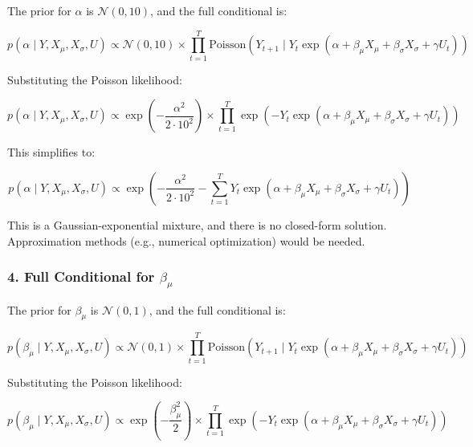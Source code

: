 \documentclass[
  letterpaper,
  DIV=11,
  numbers=noendperiod]{scrartcl}
\begin{document}
The prior for \(\alpha\) is \(\mathcal{N}(0, 10)\), and the full
conditional is:

\begin{equation}
p(\alpha \mid Y, X_{\mu}, X_{\sigma}, U) \propto \mathcal{N}(0, 10) \times \prod_{t=1}^{T} \text{Poisson}(Y_{t+1} \mid Y_t \exp(\alpha + \beta_{\mu} X_{\mu} + \beta_{\sigma} X_{\sigma} + \gamma U_t))
\end{equation}

Substituting the Poisson likelihood:

\begin{equation}
p(\alpha \mid Y, X_{\mu}, X_{\sigma}, U) \propto \exp\left( -\frac{\alpha^2}{2 \cdot 10^2} \right) \times \prod_{t=1}^{T} \exp\left( -Y_t \exp(\alpha + \beta_{\mu} X_{\mu} + \beta_{\sigma} X_{\sigma} + \gamma U_t) \right)
\end{equation}

This simplifies to:

\begin{equation}
p(\alpha \mid Y, X_{\mu}, X_{\sigma}, U) \propto \exp\left( -\frac{\alpha^2}{2 \cdot 10^2} - \sum_{t=1}^{T} Y_t \exp(\alpha + \beta_{\mu} X_{\mu} + \beta_{\sigma} X_{\sigma} + \gamma U_t) \right)
\end{equation}

This is a Gaussian-exponential mixture, and there is no closed-form
solution. Approximation methods (e.g., numerical optimization) would be
needed.

\subsubsection{\texorpdfstring{4. Full Conditional for
\(\beta_{\mu}\)}{4. Full Conditional for \textbackslash beta\_\{\textbackslash mu\}}}\label{full-conditional-for-beta_mu}

The prior for \(\beta_{\mu}\) is \(\mathcal{N}(0, 1)\), and the full
conditional is:

\begin{equation}
p(\beta_{\mu} \mid Y, X_{\mu}, X_{\sigma}, U) \propto \mathcal{N}(0, 1) \times \prod_{t=1}^{T} \text{Poisson}(Y_{t+1} \mid Y_t \exp(\alpha + \beta_{\mu} X_{\mu} + \beta_{\sigma} X_{\sigma} + \gamma U_t))
\end{equation}

Substituting the Poisson likelihood:

\begin{equation}
p(\beta_{\mu} \mid Y, X_{\mu}, X_{\sigma}, U) \propto \exp\left( -\frac{\beta_{\mu}^2}{2} \right) \times \prod_{t=1}^{T} \exp\left( -Y_t \exp(\alpha + \beta_{\mu} X_{\mu} + \beta_{\sigma} X_{\sigma} + \gamma U_t) \right)
\end{equation}
\end{document}
